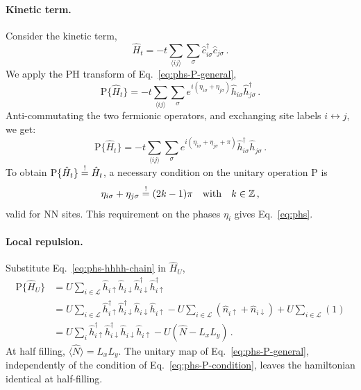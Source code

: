 \begin{tabproof}
	\paragraph{Kinetic term.}
	
	Consider the kinetic term,
	\[
		\hat H_t = -t \sum_{\langle ij \rangle} \sum_\sigma \hat c_{i\sigma}^\dagger \hat c_{j\sigma} \, .
	\]
	We apply the PH transform of Eq.~\eqref{eq:phs-P-general},
	\[
		\mathrm{P} \lbrace \hat H_t \rbrace = -t \sum_{\langle ij \rangle} \sum_\sigma e^{i(\eta_{i\sigma} + \eta_{j\sigma})} \hat h_{i\sigma} \hat h_{j\sigma}^\dagger \, .
	\]
	Anti-commutating the two fermionic operators, and exchanging site labels $i \leftrightarrow j$, we get:
	\[
		\mathrm{P} \lbrace \hat H_t \rbrace = -t \sum_{\langle ij \rangle} \sum_\sigma e^{i(\eta_{i\sigma} + \eta_{j\sigma}+\pi)} \hat h_{i\sigma}^\dagger \hat h_{j\sigma} \, .
	\]
	To obtain $\mathrm{P} \lbrace \hat H_t \rbrace \stackrel{!}{=} \hat H_t$, a necessary condition on the unitary operation $\mathrm{P}$ is
	\begin{equation}\label{eq:phs-P-condition}
		\eta_{i\sigma} + \eta_{j\sigma} \Ieq (2k-1)\pi
		\qq{with}
		k\in\mathbb{Z} \, ,
	\end{equation}
	valid for NN sites. This requirement on the phases $\eta_i$ gives Eq.~\eqref{eq:phs}.
	
	\paragraph{Local repulsion.}
	
	Substitute Eq.~\eqref{eq:phs-hhhh-chain} in $\hat H_U$,
	\[
	\begin{aligned}
		\mathrm{P} \lbrace \hat H_U \rbrace &= U \sum_{i\in\mathcal{L}} \hat h_{i\uparrow} \hat h_{i\downarrow} \hat h_{i\downarrow}^\dagger \hat h_{i\uparrow}^\dagger \\
		&= U \sum_{i\in\mathcal{L}} \hat h_{i\uparrow}^\dagger \hat h_{i\downarrow}^\dagger \hat h_{i\downarrow}\hat h_{i\uparrow} - U \sum_{i\in\mathcal{L}} \left(
			\hat n_{i\uparrow} + \hat n_{i\downarrow}
		\right) + U \sum_{i\in\mathcal{L}} (1) \\
		&= U \sum_i \hat h_{i\uparrow}^\dagger \hat h_{i\downarrow}^\dagger \hat h_{i\downarrow}\hat h_{i\uparrow} - U (\hat N - L_x L_y) \, .
	\end{aligned}
	\]
	At half filling, $\langle \hat N \rangle = L_x L_y$. The unitary map of Eq.~\eqref{eq:phs-P-general}, independently of the condition of Eq.~\eqref{eq:phs-P-condition}, leaves the hamiltonian identical at half-filling.
	

\end{tabproof}
